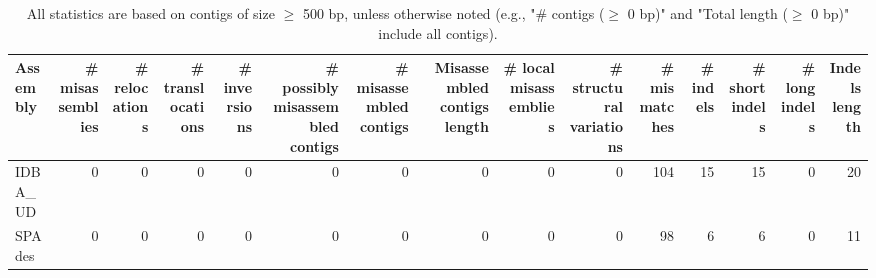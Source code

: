 \documentclass[12pt,a4paper]{article}
\begin{document}
\begin{table}[ht]
\begin{center}
\caption{All statistics are based on contigs of size $\geq$ 500 bp, unless otherwise noted (e.g., "\# contigs ($\geq$ 0 bp)" and "Total length ($\geq$ 0 bp)" include all contigs).}
\begin{tabular}{|l*{14}{|r}|}
\hline
Assembly & \# misassemblies &     \# relocations &     \# translocations &     \# inversions & \# possibly misassembled contigs & \# misassembled contigs & Misassembled contigs length & \# local misassemblies & \# structural variations & \# mismatches & \# indels &     \# short indels &     \# long indels & Indels length \\ \hline
IDBA\_UD & 0 & 0 & 0 & 0 & 0 & 0 & 0 & 0 & 0 & 104 & 15 & 15 & 0 & 20 \\ \hline
SPAdes & 0 & 0 & 0 & 0 & 0 & 0 & 0 & 0 & 0 & 98 & 6 & 6 & 0 & 11 \\ \hline
\end{tabular}
\end{center}
\end{table}
\end{document}
